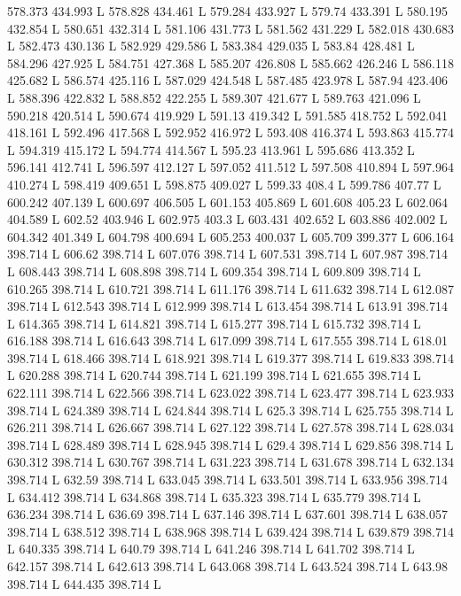 578.373 434.993 L
578.828 434.461 L
579.284 433.927 L
579.74 433.391 L
580.195 432.854 L
580.651 432.314 L
581.106 431.773 L
581.562 431.229 L
582.018 430.683 L
582.473 430.136 L
582.929 429.586 L
583.384 429.035 L
583.84 428.481 L
584.296 427.925 L
584.751 427.368 L
585.207 426.808 L
585.662 426.246 L
586.118 425.682 L
586.574 425.116 L
587.029 424.548 L
587.485 423.978 L
587.94 423.406 L
588.396 422.832 L
588.852 422.255 L
589.307 421.677 L
589.763 421.096 L
590.218 420.514 L
590.674 419.929 L
591.13 419.342 L
591.585 418.752 L
592.041 418.161 L
592.496 417.568 L
592.952 416.972 L
593.408 416.374 L
593.863 415.774 L
594.319 415.172 L
594.774 414.567 L
595.23 413.961 L
595.686 413.352 L
596.141 412.741 L
596.597 412.127 L
597.052 411.512 L
597.508 410.894 L
597.964 410.274 L
598.419 409.651 L
598.875 409.027 L
599.33 408.4 L
599.786 407.77 L
600.242 407.139 L
600.697 406.505 L
601.153 405.869 L
601.608 405.23 L
602.064 404.589 L
602.52 403.946 L
602.975 403.3 L
603.431 402.652 L
603.886 402.002 L
604.342 401.349 L
604.798 400.694 L
605.253 400.037 L
605.709 399.377 L
606.164 398.714 L
606.62 398.714 L
607.076 398.714 L
607.531 398.714 L
607.987 398.714 L
608.443 398.714 L
608.898 398.714 L
609.354 398.714 L
609.809 398.714 L
610.265 398.714 L
610.721 398.714 L
611.176 398.714 L
611.632 398.714 L
612.087 398.714 L
612.543 398.714 L
612.999 398.714 L
613.454 398.714 L
613.91 398.714 L
614.365 398.714 L
614.821 398.714 L
615.277 398.714 L
615.732 398.714 L
616.188 398.714 L
616.643 398.714 L
617.099 398.714 L
617.555 398.714 L
618.01 398.714 L
618.466 398.714 L
618.921 398.714 L
619.377 398.714 L
619.833 398.714 L
620.288 398.714 L
620.744 398.714 L
621.199 398.714 L
621.655 398.714 L
622.111 398.714 L
622.566 398.714 L
623.022 398.714 L
623.477 398.714 L
623.933 398.714 L
624.389 398.714 L
624.844 398.714 L
625.3 398.714 L
625.755 398.714 L
626.211 398.714 L
626.667 398.714 L
627.122 398.714 L
627.578 398.714 L
628.034 398.714 L
628.489 398.714 L
628.945 398.714 L
629.4 398.714 L
629.856 398.714 L
630.312 398.714 L
630.767 398.714 L
631.223 398.714 L
631.678 398.714 L
632.134 398.714 L
632.59 398.714 L
633.045 398.714 L
633.501 398.714 L
633.956 398.714 L
634.412 398.714 L
634.868 398.714 L
635.323 398.714 L
635.779 398.714 L
636.234 398.714 L
636.69 398.714 L
637.146 398.714 L
637.601 398.714 L
638.057 398.714 L
638.512 398.714 L
638.968 398.714 L
639.424 398.714 L
639.879 398.714 L
640.335 398.714 L
640.79 398.714 L
641.246 398.714 L
641.702 398.714 L
642.157 398.714 L
642.613 398.714 L
643.068 398.714 L
643.524 398.714 L
643.98 398.714 L
644.435 398.714 L
